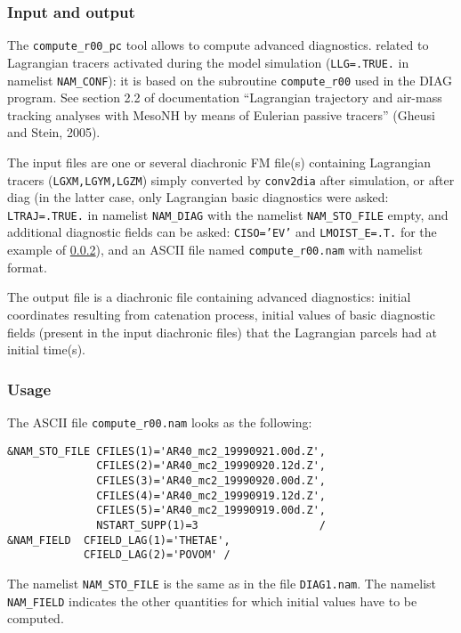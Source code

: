 \subsubsection{Input and output}
The \texttt{compute\_r00\_pc} tool allows to compute advanced 
diagnostics. 
related to Lagrangian tracers activated during the model simulation
(\texttt{LLG=.TRUE.} in namelist \texttt{NAM\_CONF}): it is based on the subroutine \texttt{compute\_r00} used in the DIAG program.
See section 2.2 of documentation
``Lagrangian trajectory and air-mass tracking analyses with
MesoNH by means of Eulerian passive tracers'' (Gheusi and Stein, 2005).

The input files are one or several diachronic FM file(s) containing Lagrangian
tracers (\texttt{LGXM,LGYM,LGZM}) simply converted by \texttt{conv2dia} after
simulation, or after {\sc diag} (in the latter case, only Lagrangian
basic diagnostics were asked: \texttt{LTRAJ=.TRUE.} 
in namelist \texttt{NAM\_DIAG} with the namelist
\texttt{NAM\_STO\_FILE} empty, and additional diagnostic fields can be asked:
\texttt{CISO='EV'} and \texttt{LMOIST\_E=.T.} 
for the example of \ref{sss:compute.nam}), 
and an ASCII file named \texttt{compute\_r00.nam} with namelist format.

The output file is a diachronic file containing advanced diagnostics: initial
 coordinates resulting from catenation process, initial values of basic 
diagnostic fields (present in the input diachronic files) that the Lagrangian
parcels had at initial time(s). 


\subsubsection{Usage} \label{sss:compute.nam}
The ASCII file \texttt{compute\_r00.nam} looks as the following:
\begin{verbatim}
&NAM_STO_FILE CFILES(1)='AR40_mc2_19990921.00d.Z',
              CFILES(2)='AR40_mc2_19990920.12d.Z',
              CFILES(3)='AR40_mc2_19990920.00d.Z',
              CFILES(4)='AR40_mc2_19990919.12d.Z', 
              CFILES(5)='AR40_mc2_19990919.00d.Z',
              NSTART_SUPP(1)=3                   /
&NAM_FIELD  CFIELD_LAG(1)='THETAE',
            CFIELD_LAG(2)='POVOM' /
\end{verbatim}
The namelist \texttt{NAM\_STO\_FILE} is the same as in the file
 \texttt{DIAG1.nam}. The namelist \texttt{NAM\_FIELD} indicates the other
quantities for which initial values have to be computed.
\\

